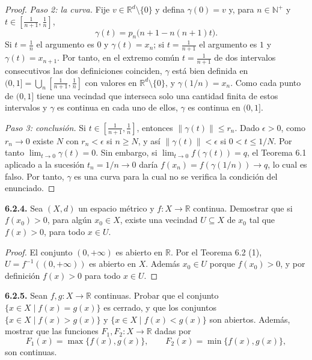 \documentclass[11pt]{article}
\newcommand{\R}{\mathbb{R}}
\newcommand{\N}{\mathbb{N}}
\newcommand{\norm}[1]{\lVert #1\rVert}
\begin{document}
\begin{proof}
  \emph{Paso 2: la curva.} Fije $v\in\R^d\setminus\{0\}$ y defina $\gamma(0)=v$ y, para $n\in\N^+$ y $t\in[\frac1{n+1},\frac1n]$,
  \[
  \gamma(t)=p_n\big(n+1-n(n+1)t\big).
  \]
  Si $t=\frac1n$ el argumento es $0$ y $\gamma(t)=x_n$; si $t=\frac1{n+1}$ el argumento es $1$ y $\gamma(t)=x_{n+1}$. Por tanto, en el extremo común $t=\frac1{n+1}$ de dos intervalos consecutivos las dos definiciones coinciden, $\gamma$ está bien definida en $(0,1]=\bigcup_{n}[\frac1{n+1},\frac1n]$ con valores en $\R^d\setminus\{0\}$, y $\gamma(1/n)=x_n$. Como cada punto de $(0,1]$ tiene una vecindad que interseca solo una cantidad finita de estos intervalos y $\gamma$ es continua en cada uno de ellos, $\gamma$ es continua en $(0,1]$.

  \emph{Paso 3: conclusión.} Si $t\in[\frac1{n+1},\frac1n]$, entonces $\norm{\gamma(t)}\le r_n$. Dado $\epsilon>0$, como $r_n\to 0$ existe $N$ con $r_n<\epsilon$ si $n\ge N$, y así $\norm{\gamma(t)}<\epsilon$ si $0<t\le 1/N$. Por tanto $\lim_{t\to 0}\gamma(t)=0$. Sin embargo, si $\lim_{t\to 0}f(\gamma(t))=q$, el Teorema 6.1 aplicado a la sucesión $t_n=1/n\to 0$ daría $f(x_n)=f(\gamma(1/n))\to q$, lo cual es falso. Por tanto, $\gamma$ es una curva para la cual no se verifica la condición del enunciado.
  \end{proof}

  \textbf{6.2.4.} Sea $(X,d)$ un espacio métrico y $f:X\to\R$ continua. Demostrar que si $f(x_0)>0$, para algún $x_0\in X$, existe una vecindad $U\subseteq X$ de $x_0$ tal que $f(x)>0$, para todo $x\in U$.

  \begin{proof}
  El conjunto $(0,+\infty)$ es abierto en $\R$. Por el Teorema 6.2 (1), $U=f^{-1}((0,+\infty))$ es abierto en $X$. Además $x_0\in U$ porque $f(x_0)>0$, y por definición $f(x)>0$ para todo $x\in U$.
  \end{proof}

  \textbf{6.2.5.} Sean $f,g:X\to\R$ continuas. Probar que el conjunto $\{x\in X\mid f(x)=g(x)\}$ es cerrado, y que los conjuntos $\{x\in X\mid f(x)>g(x)\}$ y $\{x\in X\mid f(x)<g(x)\}$ son abiertos. Además, mostrar que las funciones $F_1,F_2:X\to\R$ dadas por
  \[
  F_1(x)=\max\{f(x),g(x)\},\qquad F_2(x)=\min\{f(x),g(x)\},
  \]
  son continuas.
\end{document}
